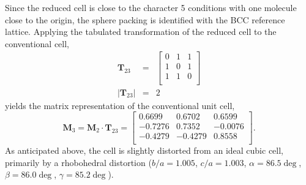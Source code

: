 \documentclass{iucr}              %
\begin{document}
Since the reduced cell is close to the character 5 conditions with one molecule close to the origin, the sphere packing is identified with the BCC reference lattice.  Applying the tabulated transformation of the reduced cell to the conventional cell, \cite{Hahn02VolA}
\begin{eqnarray}
   \mathbf{T}_{23}&=&\left[
     \begin{array}{ccc}
        0& 1& 1\\
        1& 0& 1\\
        1& 1& 0\\
     \end{array}
  \right]\\
   \vert\mathbf{T}_{23}\vert&=&2
\end{eqnarray}
yields the matrix representation of the conventional unit cell,
\begin{equation}
   \mathbf{M}_{3}=\mathbf{M}_{2}\cdot\mathbf{T}_{23}=\left[
     \begin{array}{ccc}
        0.6699& 0.6702& 0.6599\\
        -0.7276& 0.7352& -0.0076\\
        -0.4279& -0.4279& 0.8558\\
     \end{array}
  \right].
\end{equation}
As anticipated above, the cell is slightly distorted from an ideal cubic cell, primarily by a rhobohedral distortion ($b/a=1.005$, $c/a=1.003$, $\alpha=86.5\deg$, $\beta=86.0\deg$, $\gamma=85.2\deg$).
\end{document}
